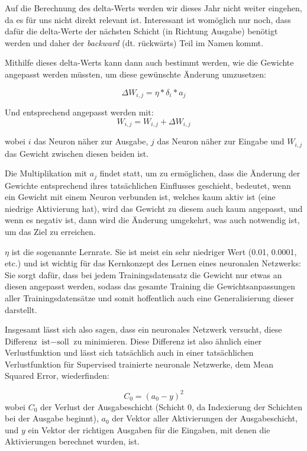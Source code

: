 \documentclass[10pt]{article}
\newcommand{\form}[1]{#1} %
\newcommand{\eng}[1]{\textit{#1}}
\begin{document}
Auf die Berechnung des delta-Werts werden wir dieses Jahr nicht weiter eingehen, da es für uns nicht direkt relevant ist.
Interessant ist womöglich nur noch, dass dafür die delta-Werte der nächsten Schicht (in Richtung Ausgabe) benötigt werden und daher der \eng{backward} (dt. rückwärts) Teil im Namen kommt.

Mithilfe dieses delta-Werts kann dann auch bestimmt werden, wie die Gewichte angepasst werden müssten, um diese gewünschte Änderung umzusetzen:

\form{\[
	\Delta W_{i,j} = \eta * \delta_i * a_j
\]}

Und entsprechend angepasst werden mit:
\form{\[
    W_{i,j} = W_{i,j} + \Delta W_{i,j}
\]}

\noindent wobei $i$ das Neuron näher zur Ausgabe, $j$ das Neuron näher zur Eingabe und $W_{i,j}$ das Gewicht zwischen diesen beiden ist.

Die Multiplikation mit $a_j$ findet statt, um zu ermöglichen, dass die Änderung der Gewichte entsprechend ihres tatsächlichen Einflusses geschieht, bedeutet, wenn ein Gewicht mit einem Neuron verbunden ist, welches kaum aktiv ist (eine niedrige Aktivierung hat), wird das Gewicht zu diesem auch kaum angepasst, und wenn es negativ ist, dann wird die Änderung umgekehrt, was auch notwendig ist, um das Ziel zu erreichen.

$\eta$ ist die sogenannte Lernrate.
Sie ist meist ein sehr niedriger Wert (0.01, 0.0001, etc.) und ist wichtig für das Kernkonzept des Lernen eines neuronalen Netzwerks:
Sie sorgt dafür, dass bei jedem Trainingsdatensatz die Gewicht nur etwas an diesen angepasst werden, sodass das gesamte Training die Gewichtsanpassungen aller Trainingsdatensätze und somit hoffentlich auch eine Generalisierung dieser darstellt.

Insgesamt lässt sich also sagen, dass ein neuronales Netzwerk versucht, diese Differenz $\textrm{ist} - \textrm{soll}$ zu minimieren.
Diese Differenz ist also ähnlich einer Verlustfunktion und lässt sich tatsächlich auch in einer tatsächlichen Verlustfunktion für Supervised trainierte neuronale Netzwerke, dem Mean Squared Error, wiederfinden:

\form{ \[
	C_0 = (a_0 - y)^2
\]}
\noindent wobei $C_0$ der Verlust der Ausgabeschicht (Schicht $0$, da Indexierung der Schichten bei der Ausgabe beginnt), $a_0$ der Vektor aller Aktivierungen der Ausgabeschicht, und $y$ ein Vektor der richtigen Ausgaben für die Eingaben, mit denen die Aktivierungen berechnet wurden, ist.
\end{document}
